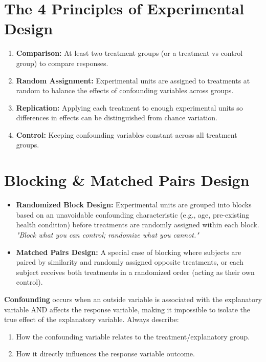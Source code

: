 \section{The 4 Principles of Experimental Design}

\begin{enumerate}
    \item \textbf{Comparison:} At least two treatment groups (or a treatment vs control group) to compare responses.
    \item \textbf{Random Assignment:} Experimental units are assigned to treatments at random to balance the effects of confounding variables across groups.
    \item \textbf{Replication:} Applying each treatment to enough experimental units so differences in effects can be distinguished from chance variation.
    \item \textbf{Control:} Keeping confounding variables constant across all treatment groups.
\end{enumerate}

\section{Blocking \& Matched Pairs Design}

\begin{itemize}
    \item \textbf{Randomized Block Design:} Experimental units are grouped into blocks based on an unavoidable confounding characteristic (e.g., age, pre-existing health condition) before treatments are randomly assigned within each block. \emph{"Block what you can control; randomize what you cannot."}
    \item \textbf{Matched Pairs Design:} A special case of blocking where subjects are paired by similarity and randomly assigned opposite treatments, or each subject receives both treatments in a randomized order (acting as their own control).
\end{itemize}

\begin{trapbox}
\textbf{Confounding} occurs when an outside variable is associated with the explanatory variable AND affects the response variable, making it impossible to isolate the true effect of the explanatory variable. Always describe:
\begin{enumerate}
    \item How the confounding variable relates to the treatment/explanatory group.
    \item How it directly influences the response variable outcome.
\end{enumerate}
\end{trapbox}
